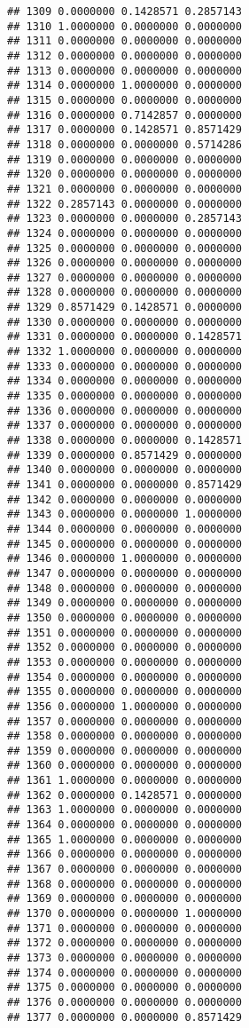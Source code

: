 \documentclass[
]{article}
\begin{document}
\begin{verbatim}
## 1309 0.0000000 0.1428571 0.2857143
## 1310 1.0000000 0.0000000 0.0000000
## 1311 0.0000000 0.0000000 0.0000000
## 1312 0.0000000 0.0000000 0.0000000
## 1313 0.0000000 0.0000000 0.0000000
## 1314 0.0000000 1.0000000 0.0000000
## 1315 0.0000000 0.0000000 0.0000000
## 1316 0.0000000 0.7142857 0.0000000
## 1317 0.0000000 0.1428571 0.8571429
## 1318 0.0000000 0.0000000 0.5714286
## 1319 0.0000000 0.0000000 0.0000000
## 1320 0.0000000 0.0000000 0.0000000
## 1321 0.0000000 0.0000000 0.0000000
## 1322 0.2857143 0.0000000 0.0000000
## 1323 0.0000000 0.0000000 0.2857143
## 1324 0.0000000 0.0000000 0.0000000
## 1325 0.0000000 0.0000000 0.0000000
## 1326 0.0000000 0.0000000 0.0000000
## 1327 0.0000000 0.0000000 0.0000000
## 1328 0.0000000 0.0000000 0.0000000
## 1329 0.8571429 0.1428571 0.0000000
## 1330 0.0000000 0.0000000 0.0000000
## 1331 0.0000000 0.0000000 0.1428571
## 1332 1.0000000 0.0000000 0.0000000
## 1333 0.0000000 0.0000000 0.0000000
## 1334 0.0000000 0.0000000 0.0000000
## 1335 0.0000000 0.0000000 0.0000000
## 1336 0.0000000 0.0000000 0.0000000
## 1337 0.0000000 0.0000000 0.0000000
## 1338 0.0000000 0.0000000 0.1428571
## 1339 0.0000000 0.8571429 0.0000000
## 1340 0.0000000 0.0000000 0.0000000
## 1341 0.0000000 0.0000000 0.8571429
## 1342 0.0000000 0.0000000 0.0000000
## 1343 0.0000000 0.0000000 1.0000000
## 1344 0.0000000 0.0000000 0.0000000
## 1345 0.0000000 0.0000000 0.0000000
## 1346 0.0000000 1.0000000 0.0000000
## 1347 0.0000000 0.0000000 0.0000000
## 1348 0.0000000 0.0000000 0.0000000
## 1349 0.0000000 0.0000000 0.0000000
## 1350 0.0000000 0.0000000 0.0000000
## 1351 0.0000000 0.0000000 0.0000000
## 1352 0.0000000 0.0000000 0.0000000
## 1353 0.0000000 0.0000000 0.0000000
## 1354 0.0000000 0.0000000 0.0000000
## 1355 0.0000000 0.0000000 0.0000000
## 1356 0.0000000 1.0000000 0.0000000
## 1357 0.0000000 0.0000000 0.0000000
## 1358 0.0000000 0.0000000 0.0000000
## 1359 0.0000000 0.0000000 0.0000000
## 1360 0.0000000 0.0000000 0.0000000
## 1361 1.0000000 0.0000000 0.0000000
## 1362 0.0000000 0.1428571 0.0000000
## 1363 1.0000000 0.0000000 0.0000000
## 1364 0.0000000 0.0000000 0.0000000
## 1365 1.0000000 0.0000000 0.0000000
## 1366 0.0000000 0.0000000 0.0000000
## 1367 0.0000000 0.0000000 0.0000000
## 1368 0.0000000 0.0000000 0.0000000
## 1369 0.0000000 0.0000000 0.0000000
## 1370 0.0000000 0.0000000 1.0000000
## 1371 0.0000000 0.0000000 0.0000000
## 1372 0.0000000 0.0000000 0.0000000
## 1373 0.0000000 0.0000000 0.0000000
## 1374 0.0000000 0.0000000 0.0000000
## 1375 0.0000000 0.0000000 0.0000000
## 1376 0.0000000 0.0000000 0.0000000
## 1377 0.0000000 0.0000000 0.8571429

\end{verbatim}
\end{document}
